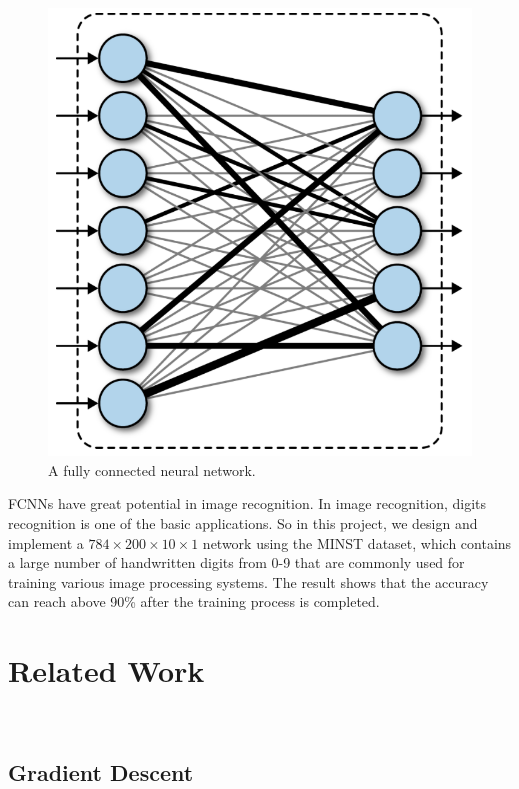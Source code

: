 \documentclass[twoside,twocolumn]{article}
\begin{document}
\begin{figure}
	\centering
	\includegraphics[width=1.0\columnwidth, clip=true]{fig/fcnn.png}
	\vspace{-4mm}
	\caption{A fully connected neural network.}
	\label{fig:fcnn}
	\vspace{-5mm}
\end{figure}

FCNNs have great potential in image recognition. In image recognition, digits recognition is one of the basic applications. So in this project, we design and implement a $784 \times 200 \times 10 \times 1$ network using the MINST dataset, which contains a large number of handwritten digits from 0-9 that are commonly used for training various image processing systems. The result shows that the accuracy can reach above 90\% after the training process is completed.


\section{Related Work}~\label{sec:related}

\subsection{Gradient Descent}
\end{document}
